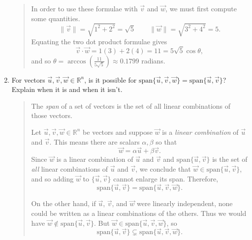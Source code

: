 \documentclass[letter]{article}
\newcommand{\R}{\mathbb{R}}
\newcommand{\Span}{\mathrm{span}}
\begin{document}
\begin{enumerate}
\begin{quote}
			In order to use these formulae with $\vec v$ and $\vec w$, we
			must first compute some quantities. 
			\[
				\|\vec v\| = \sqrt{1^2+2^2}=\sqrt{5}\qquad
				\|\vec w\| = \sqrt{3^2+4^2}=5.
			\]
			Equating the two dot product formulae gives
			\[
				\vec v\cdot\vec w = 1(3)+2(4) = 11=5\sqrt{5}\cos\theta,
			\]
			and so $\theta=\arccos\left(\frac{11}{5\sqrt{5}}\right)\approx 0.1799$ radians.
		\end{quote}

		\item For vectors $\vec u,\vec v,\vec w\in\R^n$, is it possible for
		$\Span\{\vec u,\vec v,\vec w\}=\Span\{\vec u,\vec v\}$?  Explain when it is
		and when it isn't.
		\begin{quote}
			The \emph{span} of a set of vectors is the set of all
			linear combinations of those vectors.

			Let $\vec u,\vec v,\vec w\in\R^n$ be vectors and suppose
			$\vec w$ is a \emph{linear combination} of $\vec u$ and $\vec v$.
			This means there are scalars $\alpha,\beta$ so that
			\[
				\vec w=\alpha\vec u+\beta\vec v.
			\]
			Since $\vec w$ is a linear combination of $\vec u$ and $\vec v$
			and $\Span\{\vec u,\vec v\}$ is the set of \emph{all}
			linear combinations of $\vec u$ and $\vec v$, we conclude that
			$\vec w\in\Span\{\vec u,\vec v\}$, and so adding $\vec w$
			to $\{\vec u,\vec v\}$ cannot enlarge its span.  Therefore,
			\[
				\Span\{\vec u,\vec v\}=\Span\{\vec u,\vec v,\vec w\}.
			\]

			On the other hand, if $\vec u$, $\vec v$, and $\vec w$ were
			linearly independent, none could be written as a linear combinations
			of the others.  Thus we would have $\vec w\notin\Span\{\vec u,\vec v\}$.
			But $\vec w\in \Span\{\vec u,\vec v,\vec w\}$, 
			so
			\[
				\Span\{\vec u,\vec v\}\subsetneq\Span\{\vec u,\vec v,\vec w\}.
			\]
		\end{quote}
	\end{enumerate}
\end{document}
